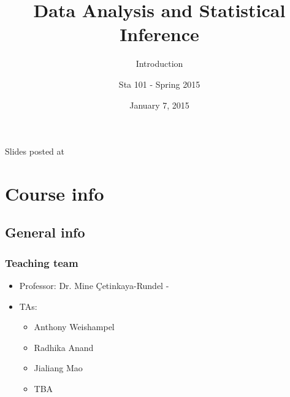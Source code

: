\documentclass[11pt,containsverbatim,handout,xcolor=xelatex,dvipsnames,table]{beamer}
\title{Data Analysis and Statistical Inference}
\subtitle{Introduction}
\author{Sta 101 - Spring 2015}
\date{January 7, 2015}
\institute{Duke University, Department of Statistical Science}
\begin{document}



\begin{frame}[plain]

\titlepage
\vfill
{\scriptsize {} \hfill Slides posted at  }
\addtocounter{framenumber}{-1} 

\end{frame}


\section{Course info}



\subsection{General info}


\begin{frame}
\frametitle{Teaching team}

\begin{itemize}

\item Professor: Dr. Mine \c{C}etinkaya-Rundel - 

\item TAs:
\begin{itemize}
\item Anthony Weishampel
\item Radhika Anand
\item Jialiang Mao
\item TBA
\end{itemize}

\end{itemize}

\end{frame}

\end{document}
